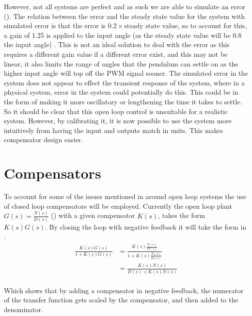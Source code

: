 \documentclass[a4paper, 11pt, compsoc]{IEEEtran}
\begin{document}
		However, not all systems are perfect and as such we are able to simulate an error (). The relation between the error and the steady state value for the system with simulated error is that the error is $0.2 \times \text{steady state value}$, so to account for this, a gain of 1.25 is applied to the input angle (as the steady state value will be 0.8 the input angle) . This is not an ideal solution to deal with the error as this requires a different gain value if a different error exist, and this may not be linear, it also limits the range of angles that the pendulum can settle on as the higher input angle will top off the PWM signal sooner. The simulated error in the system does not appear to effect the transient response of the system, where in a physical system, error in the system could potentially do this. This could be in the form of making it more oscillatory or lengthening the time it takes to settle. So it should be clear that this open loop control is unsuitable for a realistic system. However, by calibrating it, it is now possible to use the system more intuitively from having the input and outputs match in units. This makes compensator design easier.
	\section{Compensators}\label{sec:comp}
		To account for some of the issues mentioned in  around open loop systems the use of closed loop compensators will be employed. Currently the open loop plant $G(s) = \frac{N(s)}{D(s)}$ () with a given compensator $K(s)$, takes the form $K(s) G(s)$. By closing the loop with negative feedback it will take the form in .
		\begin{equation}
			\label{eq:cltf}
			\begin{split}
				\frac{K(s)G(s)}{1 + K(s)G(s)} & = \frac{K(s)\frac{N(s)}{D(s)}}{1 + K(s)\frac{N(s)}{D(s)}} \\
				& = \frac{K(s)N(s)}{D(s) + K(s)N(s)}\\
			\end{split}
		\end{equation}
		\par
		Which shows that by adding a compensator in negative feedback, the numerator of the transfer function gets scaled by the compensator, and then added to the denominator. 
\end{document}
